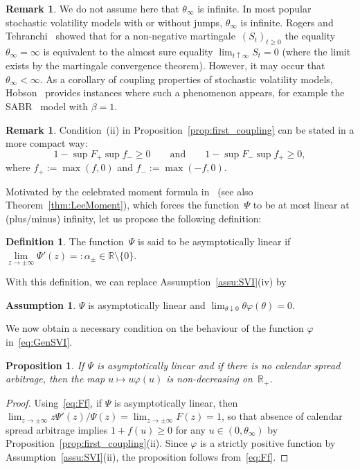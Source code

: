 \documentclass{amsart}[11pt]
\numberwithin{equation}{section}
\newtheorem{proposition}[theorem]{Proposition}
\theoremstyle{definition}
\newtheorem{definition}[theorem]{Definition}
\newtheorem{remark}[theorem]{Remark}
\newtheorem{assumption}[theorem]{Assumption}
\newcommand{\RR}{\mathbb{R}}
\begin{document}
\begin{remark}
We do not assume here that $\theta_\infty$ is infinite. 
In most popular stochastic volatility models with or without jumps, $\theta_\infty$ is infinite.
Rogers and Tehranchi~\cite{RT10} showed that for a non-negative martingale~$(S_t)_{t\geq 0}$ 
the equality $\theta_\infty=\infty$ is equivalent to the almost sure equality $\lim_{t\uparrow\infty}S_t=0$ (where the limit exists by the martingale convergence theorem).
However, it may occur that $\theta_\infty<\infty$. 
As a corollary of coupling properties of stochastic volatility models, Hobson~\cite{Hobson} provides instances where such a phenomenon appears, for example the SABR~\cite{Hagan} model with $\beta=1$.
\end{remark}

\begin{remark}\label{rem:F}
Condition~(ii) in Proposition~\ref{prop:first_coupling} can be stated in a more compact way:
$$1-\sup{F_+} \sup{f_-}\geq0
\qquad\text{and}\qquad
1-\sup{F_-} \sup{f_+}\geq0,$$
where $f_+:=\max(f,0)$ and $f_-:=\max(-f, 0)$.
\end{remark}

Motivated by the celebrated moment formula in~\cite{Lee} (see also Theorem~\ref{thm:LeeMoment}), 
which forces the function~$\Psi$ to be at most linear at (plus/minus) infinity, 
let us propose the following definition:
\begin{definition}\label{def:Linear}
The function~$\Psi$ is said to be asymptotically linear if 
$\lim\limits_{z\to\pm\infty}\Psi'(z)=:\alpha_\pm \in \RR\setminus\{0\}$.
\end{definition}

With this definition, we can replace Assumption~\ref{assu:SVI}(iv) by
\begin{assumption}\label{assu:payoffBis}
$\Psi$ is asymptotically linear and $\lim_{\theta\downarrow 0}\theta\varphi(\theta) = 0$.
\end{assumption}

We now obtain a necessary condition on the behaviour of the function $\varphi$ in~\eqref{eq:GenSVI}.
\begin{proposition} \label{prop:first_lin}
If $\Psi$ is asymptotically linear and if there is no calendar spread arbitrage, 
then the map $u \mapsto u \varphi(u)$ is non-decreasing on~$\RR_+$.
\end{proposition}
\begin{proof}
Using~\eqref{eq:Ff}, if $\Psi$ is asymptotically linear, then 
$\lim_{z\rightarrow \pm\infty} z\Psi'(z)/\Psi(z) = \lim_{z \rightarrow \pm\infty} F(z)=1$, 
so that absence of calendar spread arbitrage implies $1+f(u)\geq 0$ for any $u\in(0, \theta_\infty)$
by Proposition~\ref{prop:first_coupling}(ii).
Since $\varphi$ is a strictly positive function by Assumption~\ref{assu:SVI}(ii), 
the proposition follows from~\eqref{eq:Ff}.
\end{proof}
\end{document}
